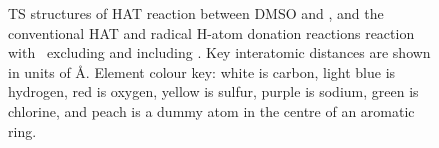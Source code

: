 \begin{doublespace}
\begin{figure}[!htbp]


\caption[TS structures of HAT reaction between DMSO and \cumo, and the
conventional HAT and radical H-atom donation reactions with \bno\ excluding and
including .]{TS structures of HAT reaction between DMSO and \cumo, and
the conventional HAT and radical H-atom donation reactions reaction with \bno\
excluding and including . Key interatomic distances are shown in units
of \AA. Element colour key: white is carbon, light blue is hydrogen, red is
oxygen, yellow is sulfur, purple is sodium, green is chlorine, and peach is a
dummy atom in the centre of an aromatic ring.}
\label{fig:dmso-ts}
\end{figure}


\end{doublespace}
